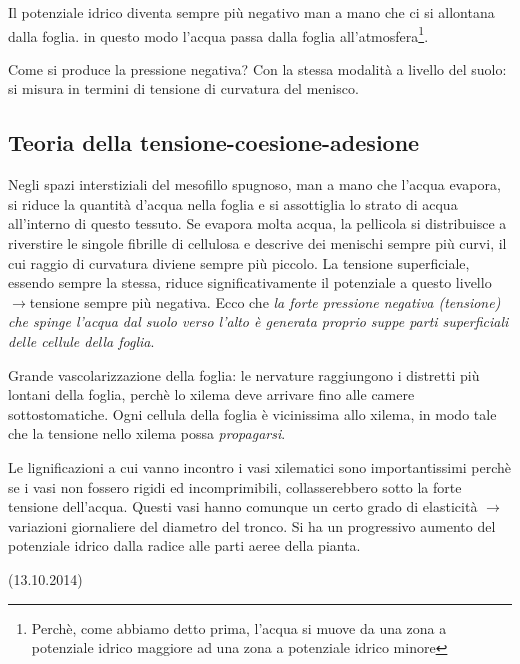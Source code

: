 \documentclass[a4paper,12pt]{book}
\newcommand{\lfreccia}{\ensuremath{\longrightarrow}}
\begin{document}
Il potenziale idrico diventa sempre più negativo man a mano che ci si allontana dalla foglia. in questo modo l'acqua passa dalla foglia all'atmosfera\footnote{Perchè, come abbiamo detto prima, l'acqua si muove da una zona a potenziale idrico maggiore ad una zona a potenziale idrico minore}.

Come si produce la pressione negativa?
Con la stessa modalità a livello del suolo: si misura in termini di tensione di curvatura del menisco. 

\subsection{Teoria della tensione-coesione-adesione}
Negli spazi interstiziali del mesofillo spugnoso, man a mano che l'acqua evapora, si riduce la quantità d'acqua nella foglia e si assottiglia lo strato di acqua all'interno di questo tessuto. Se evapora molta acqua, la pellicola si distribuisce a riverstire le singole fibrille di cellulosa e descrive dei menischi sempre più curvi, il cui raggio di curvatura diviene sempre più piccolo. La tensione superficiale, essendo sempre la stessa, riduce significativamente il potenziale a questo livello \lfreccia tensione sempre più negativa. Ecco che \emph{la forte pressione negativa (tensione) che spinge l'acqua dal suolo verso l'alto è generata proprio suppe parti superficiali delle cellule della foglia}.

Grande vascolarizzazione della foglia: le nervature raggiungono i distretti più lontani della foglia, perchè lo xilema deve arrivare fino alle camere sottostomatiche. Ogni cellula della foglia è vicinissima allo xilema, in modo tale che la tensione nello xilema possa \emph{propagarsi}.

Le lignificazioni a cui vanno incontro i vasi xilematici sono importantissimi perchè se i vasi non fossero rigidi ed incomprimibili, collasserebbero sotto la forte tensione dell'acqua. Questi vasi hanno comunque un certo grado di elasticità \lfreccia variazioni giornaliere del diametro del tronco. Si ha un progressivo aumento del potenziale idrico dalla radice alle parti aeree della pianta.

(13.10.2014)
\end{document}
